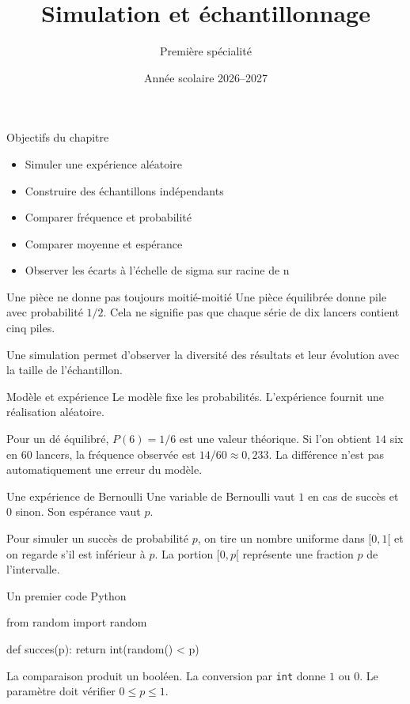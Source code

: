 \documentclass[aspectratio=169,12pt]{beamer}
\title{Simulation et échantillonnage}
\subtitle{Première spécialité}
\date{Année scolaire 2026--2027}
\begin{document}
\begin{frame}\titlepage\end{frame}
\begin{frame}{Objectifs du chapitre}\begin{itemize}
\item Simuler une expérience aléatoire
\item Construire des échantillons indépendants
\item Comparer fréquence et probabilité
\item Comparer moyenne et espérance
\item Observer les écarts à l’échelle de sigma sur racine de n
\end{itemize}\end{frame}
\renewcommand{\slidekind}{COMPRENDRE}
\begin{frame}[t,fragile]{Une pièce ne donne pas toujours moitié-moitié}
Une pièce équilibrée donne pile avec probabilité $1/2$. Cela ne signifie pas que chaque série de dix lancers contient cinq piles.\medskip\par Une simulation permet d’observer la diversité des résultats et leur évolution avec la taille de l’échantillon.
\end{frame}
\renewcommand{\slidekind}{COMPRENDRE}
\begin{frame}[t,fragile]{Modèle et expérience}
Le modèle fixe les probabilités. L’expérience fournit une réalisation aléatoire.\medskip\par Pour un dé équilibré, $P(6)=1/6$ est une valeur théorique. Si l’on obtient $14$ six en $60$ lancers, la fréquence observée est $14/60\approx0,233$. La différence n’est pas automatiquement une erreur du modèle.
\end{frame}
\renewcommand{\slidekind}{COMPRENDRE}
\begin{frame}[t,fragile]{Une expérience de Bernoulli}
Une variable de Bernoulli vaut $1$ en cas de succès et $0$ sinon. Son espérance vaut $p$.\medskip\par Pour simuler un succès de probabilité $p$, on tire un nombre uniforme dans $[0,1[$ et on regarde s’il est inférieur à $p$. La portion $[0,p[$ représente une fraction $p$ de l’intervalle.
\end{frame}
\renewcommand{\slidekind}{COMPRENDRE}
\begin{frame}[t,fragile]{Un premier code Python}
\begin{codepython}
from random import random

def succes(p):
    return int(random() < p)
\end{codepython}
La comparaison produit un booléen. La conversion par \texttt{int} donne $1$ ou $0$. Le paramètre doit vérifier $0\le p\le1$.
\end{frame}
\end{document}
